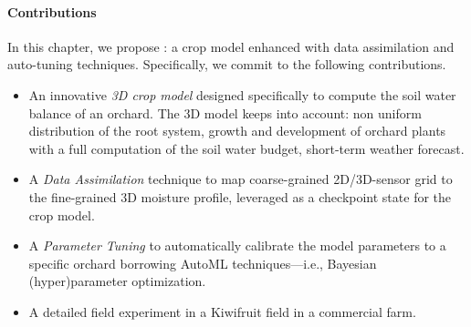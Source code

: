 


\paragraph{Contributions}
In this chapter, we propose \olab: a crop model enhanced with data assimilation and auto-tuning techniques.
Specifically, we commit to the following contributions.
\begin{itemize}
	\item An innovative \textit{3D crop model} designed specifically to compute the soil water balance of an orchard.
    The 3D model keeps into account: non uniform distribution of the root system, growth and development of orchard plants with a full computation of the soil water budget, short-term weather forecast.
    \item A \textit{Data Assimilation} technique to map coarse-grained 2D/3D-sensor grid to the fine-grained 3D moisture profile, leveraged as a checkpoint state for the crop model.
    \item A \textit{Parameter Tuning} to automatically calibrate the model parameters to a specific orchard borrowing AutoML techniques---i.e., Bayesian (hyper)parameter optimization.
	\item A detailed field experiment in a Kiwifruit field in a commercial farm.
\end{itemize}


